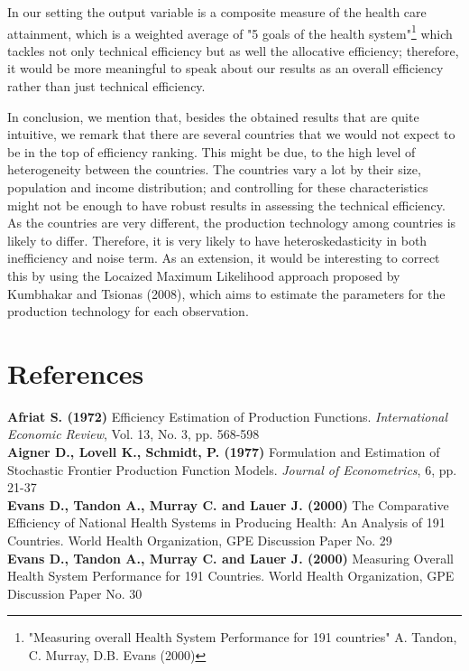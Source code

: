 \documentclass[12pt,a4paper]{article}\usepackage[]{graphicx}\usepackage[]{color}
\begin{document}
In our setting the output variable is a composite measure of the health care attainment, which is a weighted average of "5 goals of the health system"\footnote{"Measuring overall Health System Performance for 191 countries"  A. Tandon, C. Murray, D.B. Evans (2000)}  which tackles not only technical efficiency  but as well the allocative efficiency; therefore, it would be more meaningful to speak about our results as an overall efficiency rather than just technical efficiency.

In conclusion, we mention that, besides the obtained results that are quite intuitive, we remark that there are several countries that we would not  expect to be in the top of efficiency ranking. This might be due, to the high level of  heterogeneity between the countries. The countries vary a lot by their size, population and income distribution; and controlling for these characteristics might not be enough to have robust results in assessing the technical efficiency. As the countries are very different, the production technology among countries is likely to differ. Therefore, it is very likely to have  heteroskedasticity in both inefficiency and noise term. As an extension, it would be interesting to correct this  by using the Locaized Maximum Likelihood approach proposed by Kumbhakar and Tsionas (2008), which aims to estimate the parameters for the production technology for each observation.

\newpage
\section{References}
\textbf{Afriat S. (1972)} Efficiency Estimation of Production Functions. \textit{International Economic Review}, Vol. 13, No. 3, pp. 568-598 \\

\textbf{Aigner D., Lovell K., Schmidt, P. (1977)} Formulation and Estimation of Stochastic Frontier Production Function Models. \textit{Journal of Econometrics}, 6, pp. 21-37 \\

\textbf{Evans D., Tandon A., Murray C. and Lauer J. (2000)} The Comparative Efficiency of National Health Systems in Producing Health: An Analysis of 191 Countries. World Health Organization, GPE Discussion Paper No. 29 \\

\textbf{Evans D., Tandon A., Murray C. and Lauer J. (2000)} Measuring Overall Health System Performance for 191 Countries. World Health Organization, GPE Discussion Paper No. 30 \\
\end{document}
